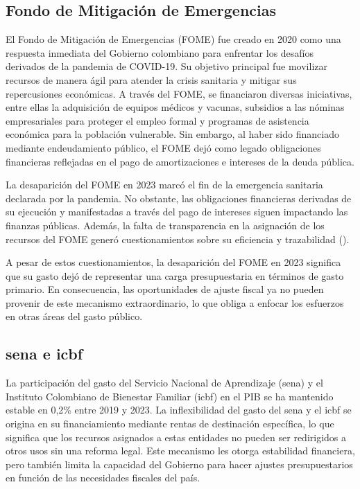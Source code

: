\subsection{Fondo de Mitigación de Emergencias}

El Fondo de Mitigación de Emergencias (FOME) fue creado en 2020 como una respuesta inmediata del Gobierno colombiano para enfrentar los desafíos derivados de la pandemia de COVID-19. Su objetivo principal fue movilizar recursos de manera ágil para atender la crisis sanitaria y mitigar sus repercusiones económicas. A través del FOME, se financiaron diversas iniciativas, entre ellas la adquisición de equipos médicos y vacunas, subsidios a las nóminas empresariales para proteger el empleo formal y programas de asistencia económica para la población vulnerable. Sin embargo, al haber sido financiado mediante endeudamiento público, el FOME dejó como legado obligaciones financieras reflejadas en el pago de amortizaciones e intereses de la deuda pública.

La desaparición del FOME en 2023 marcó el fin de la emergencia sanitaria declarada por la pandemia. No obstante, las obligaciones financieras derivadas de su ejecución y manifestadas a través del pago de intereses siguen impactando las finanzas públicas. Además, la falta de transparencia en la asignación de los recursos del FOME generó cuestionamientos sobre su eficiencia y trazabilidad (\cite{ObservatorioFiscal2020}).

A pesar de estos cuestionamientos, la desaparición del FOME en 2023 significa que su gasto dejó de representar una carga presupuestaria en términos de gasto primario. En consecuencia, las oportunidades de ajuste fiscal ya no pueden provenir de este mecanismo extraordinario, lo que obliga a enfocar los esfuerzos en otras áreas del gasto público.

\subsection{\gls{sena} e \gls{icbf}}

La participación del gasto del Servicio Nacional de Aprendizaje (\gls{sena}) y el Instituto Colombiano de Bienestar Familiar (\gls{icbf}) en el PIB se ha mantenido estable en 0,2\% entre 2019 y 2023. La inflexibilidad del gasto del \gls{sena} y el \gls{icbf} se origina en su financiamiento mediante rentas de destinación específica, lo que significa que los recursos asignados a estas entidades no pueden ser redirigidos a otros usos sin una reforma legal. Este mecanismo les otorga estabilidad financiera, pero también limita la capacidad del Gobierno para hacer ajustes presupuestarios en función de las necesidades fiscales del país. 

